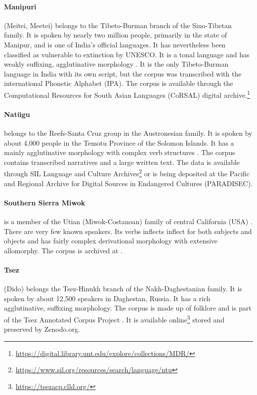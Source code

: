 \paragraph{Manipuri} 
(Meitei, Meetei) belongs to the Tibeto-Burman branch of the Sino-Tibetan family. It is spoken by nearly two million people, primarily in the state of Manipur, and is one of India's official languages. It has nevertheless been classified as vulnerable to extinction by UNESCO. It is a tonal language and has weakly suffixing, agglutinative morphology \citep{Chelliah-1997}. It is the only Tibeto-Burman language in India with its own script, but the corpus was transcribed with the international Phonetic Alphabet (IPA). The corpus is available through the Computational Resources for South Asian Languages (CoRSAL) digital archive.\footnote{\url{https://digital.library.unt.edu/explore/collections/MDR/}}

\paragraph{Natügu}
belongs to the Reefs-Santa Cruz group in the Austronesian family. It is spoken by about 4,000 people in the Temotu Province of the Solomon Islands. It has a mainly agglutinative morphology with complex verb structures \citep{naess_ntu_2008}. The corpus contains transcribed narratives and a large written text. The data is available through SIL Language and Culture Archives\footnote{\url{https://www.sil.org/resources/search/language/ntu}} or is being deposited at the Pacific and Regional Archive for Digital Sources in Endangered Cultures (PARADISEC).

\paragraph{Southern Sierra Miwok} 
is a member of the Utian (Miwok-Costanoan) family of central California (USA) \citep{broadbent_southern_1964}. There are very few known speakers. Its verbs inflects inflect for both subjects and objects and has fairly complex derivational morphology with extensive allomorphy. The corpus is archived at .

\paragraph{Tsez}
(Dido) belongs the Tsez-Hinukh branch of the Nakh-Daghestanian family. It is spoken by about 12,500 speakers in Daghestan, Russia. It has a rich agglutinative, suffixing morphology. The corpus is made up of folklore and is part of the Tsez Annotated Corpus Project \citep{abdulaev-tsezcorpus-2010}. It is available online\footnote{\url{https://tsezacp.clld.org/}} stored and preserved by Zenodo.org.

